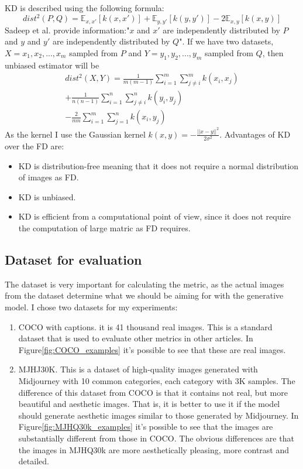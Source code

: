 KD is described using the following formula:
\begin{equation}
dist^2(P,Q)=\mathbb{E}_{x,x'}[k(x,x')] + \mathbb{E}_{y,y'}[k(y,y')] -2\mathbb{E}_{x,y}[k(x,y)]
\end{equation}
Sadeep et al. provide information:"$x$ and $x'$ are independently distributed by $P$ and $y$ and $y'$ are independently distributed by $Q$"\cite[p.5]{KD_CLIP}.
If we have two datasets, $X={x_1,x_2,...,x_m}$ sampled from $P$ and $Y={y_1,y_2,...,y_m}$ sampled from $Q$, then unbiased estimator will be
\begin{equation}
\begin{split}
dist^2(X,Y)=\frac{1}{m(m-1)}\sum_{i=1}^{m}\sum_{j\neq i}^{m}k(x_i,x_j)\\+\frac{1}{n(n-1)}\sum_{i=1}^{n}\sum_{j\neq i}^{n}k(y_i,y_j)\\-\frac{2}{mn}\sum_{i=1}^{m}\sum_{j=1}^{n}k(x_i,y_j)
\end{split}
\end{equation}
As the kernel I use the Gaussian kernel $k(x,y)=-\frac{||x-y||^2}{2\sigma^2}$. Advantages of KD over the FD are:
\begin{itemize}
    \item KD is distribution-free meaning that it does not require a normal distribution of images as FD.
    \item KD is unbiased.
    \item KD is efficient from a computational point of view, since it does not require the computation of large matric as FD requires.
\end{itemize}
\subsection{Dataset for evaluation}
The dataset is very important for calculating the metric, as the actual images from the dataset determine what we should be aiming for with the generative model. I chose two datasets for my experiments:
\begin{enumerate}
    \item COCO with captions\cite{COCODataset}. it is 41 thousand real images. This is a standard dataset that is used to evaluate other metrics in other articles\cite{KD_CLIP}. In Figure\ref{fig:COCO_examples} it's possible to see that these are real images.
    \item MJHJ30K\cite{MJHQ30K}. This is a dataset of high-quality images generated with Midjourney with 10 common categories, each category with 3K samples. The difference of this dataset from COCO is that it contains not real, but more beautiful and aesthetic images. That is, it is better to use it if the model should generate aesthetic images similar to those generated by Midjourney. In Figure\ref{fig:MJHQ30k_examples} it's possible to see that the images are substantially different from those in COCO. The obvious differences are that the images in MJHQ30k are more aesthetically pleasing, more contrast and detailed.
\end{enumerate}

